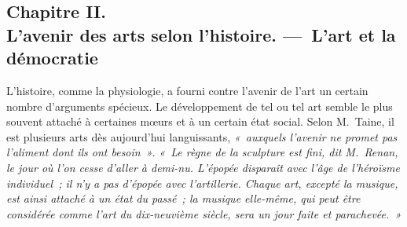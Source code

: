 \documentclass[french,twoside]{book} %
\begin{document}
\subsection[{Chapitre II. L’avenir des arts selon l’histoire. — L’art et la démocratie}]{Chapitre II. \\
L’avenir des arts selon l’histoire. — L’art et la démocratie}
\noindent  L’histoire, comme la physiologie, a fourni contre l’avenir de l’art un certain nombre d’arguments spécieux. Le développement de tel ou tel art semble le plus souvent attaché à certaines mœurs et à un certain état social. Selon M. Taine, il est plusieurs arts dès aujourd’hui languissants, \emph{« auxquels l’avenir ne promet pas l’aliment dont ils ont besoin »}. \emph{« Le règne de la sculpture est fini, dit M. Renan, le jour où l’on cesse d’aller à demi-nu. L’épopée disparaît avec l’âge de l’héroïsme individuel ; il n’y a pas d’épopée avec l’artillerie. Chaque art, excepté la musique, est ainsi attaché à un état du passé ; la musique elle-même, qui peut être considérée comme l’art du dix-neuvième siècle, sera un jour faite et parachevée. »}\par
\par
\end{document}
